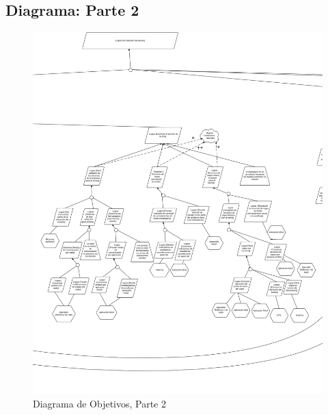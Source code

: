 \documentclass[a4paper, 10pt, twoside]{article}
\begin{document}
\subsection{Diagrama: Parte 2}
\begin{figure}[H]
  \includegraphics[width=\textwidth]{diagramas/diagrama-objetivos-1.png}
  \caption{Diagrama de Objetivos, Parte 2}
  \label{fig:diagrama-objetivos-1}
\end{figure}
\newpage
\end{document}

